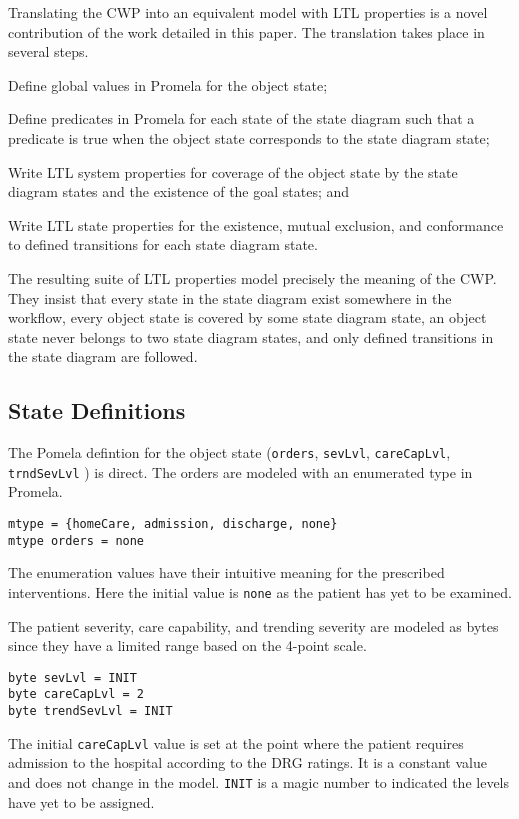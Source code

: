 Translating the CWP into an equivalent model with LTL properties is a novel contribution of the work detailed in this paper. The translation takes place in several steps.
\begin{compactenum}
  \item Define global values in Promela for the object state;
  \item Define predicates in Promela for each state of the state diagram such that a predicate is true when the object state corresponds to the state diagram state;
  \item Write LTL system properties for coverage of the object state by the state diagram states and the existence of the goal states; and
  \item Write LTL state properties for the existence, mutual exclusion, and conformance to defined transitions for each state diagram state.
\end{compactenum}
The resulting suite of LTL properties model precisely the meaning of the CWP. They insist that every state in the state diagram exist somewhere in the workflow, every object state is covered by some state diagram state, an object state never belongs to two state diagram states, and only defined transitions in the state diagram are followed.

\subsection{State Definitions}
The Pomela defintion for the object state (\texttt{orders}, \texttt{sevLvl}, \texttt{careCapLvl}, \texttt{trndSevLvl} )  is direct. The orders are modeled with an enumerated type in Promela.
%
{\small
\begin{lstlisting}[style=myPromela]
mtype = {homeCare, admission, discharge, none}
mtype orders = none
\end{lstlisting}
}
%
\noindent The enumeration values have their intuitive meaning for the prescribed interventions. Here the initial value is \texttt{none} as the patient has yet to be examined.

The patient severity, care capability, and trending severity are modeled as bytes since they have a limited range based on the 4-point scale.
%
{\small
\begin{lstlisting}[style=myPromela]
byte sevLvl = INIT
byte careCapLvl = 2
byte trendSevLvl = INIT
\end{lstlisting}
}
%
\noindent The initial \texttt{careCapLvl} value is set at the point where the patient requires admission to the hospital according to the DRG ratings. It is a constant value and does not change in the model. \texttt{INIT} is a magic number to indicated the levels have yet to be assigned.

